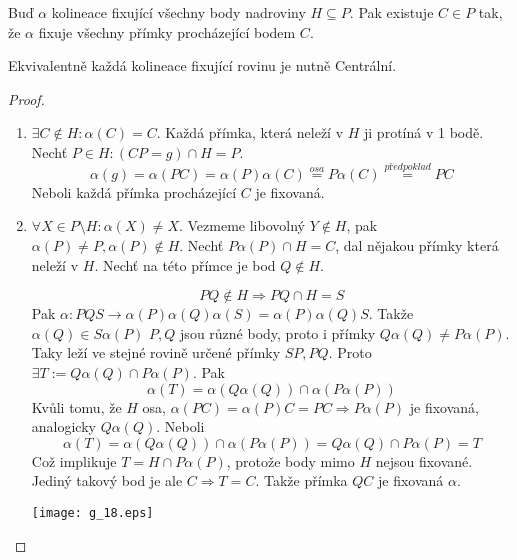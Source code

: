\begin{lemma}\label{kpp:kolin_centr_kolin}
    Buď $\alpha$ kolineace fixující všechny body nadroviny $H\subseteq P$.
    Pak existuje $C\in P$ tak, že $\alpha$ fixuje  všechny přímky procházející bodem $C$.

    Ekvivalentně každá kolineace fixující rovinu je nutně Centrální.
\end{lemma}
\begin{proof}~
    \begin{enumerate}
	    \item $ \exists C \notin H: \alpha(C) = C$.
		    Každá přímka, která neleží v $H$ ji protíná v 1 bodě.
		    Nechť $P \in H: (CP = g) \cap H = P$.
		    \[ \alpha(g) = \alpha(PC) = \alpha(P)\alpha(C) \stackrel{osa}{=} P\alpha(C) \stackrel{předpoklad}{=} PC \]
		    Neboli každá přímka procházející $C$ je fixovaná.
	    \item $ \forall X \in P \setminus H: \alpha(X) \ne X$.
		    Vezmeme libovolný $Y \notin H$, pak $\alpha(P) \ne P, \alpha(P) \notin H$.
		    Nechť $P\alpha(P) \cap H = C$, dal nějakou přímky která neleží v $H$.
		    Nechť na této přímce je bod $Q \notin H$.

		    \[ PQ \notin H \Rightarrow PQ \cap H = S \]
		    Pak $\alpha: PQS \to \alpha(P) \alpha(Q) \alpha(S) = \alpha(P) \alpha(Q) S$.
		    Takže $\alpha(Q) \in S \alpha(P)$
		    $P, Q$ jsou různé body, proto i přímky $Q\alpha(Q) \ne P\alpha(P)$.
		    Taky leží ve stejné rovině určené přímky $SP, PQ$.
		    Proto $\exists T:= Q\alpha(Q) \cap P\alpha(P)$.
		    Pak
		    \[ \alpha(T) = \alpha(Q\alpha(Q)) \cap \alpha(P\alpha(P)) \]
		    Kvůli tomu, že $H$ osa, $\alpha(PC) = \alpha(P)C = PC \Rightarrow P\alpha(P)$ je fixovaná, analogicky $Q\alpha(Q)$.
		    Neboli
		    \[ \alpha(T) = \alpha(Q\alpha(Q)) \cap \alpha(P\alpha(P)) = Q\alpha(Q) \cap P\alpha(P) = T \]
		    Což implikuje $T = H \cap P\alpha(P)$, protože body mimo $H$ nejsou fixované.
		    Jediný takový bod je ale $C \Rightarrow T = C$.
		    Takže přímka $QC$ je fixovaná $\alpha$.

    	\texttt{[image: g\_18.eps]}
    \end{enumerate}
\end{proof}

